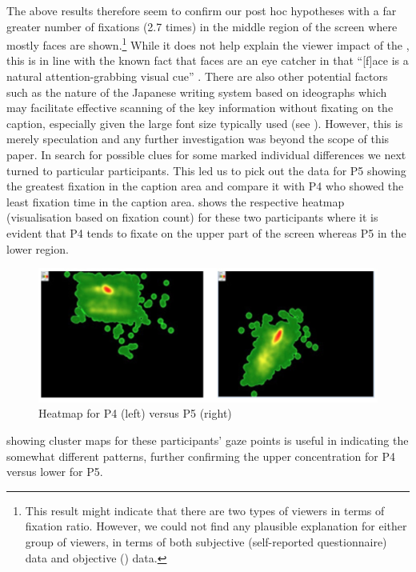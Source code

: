 \documentclass[output=paper]{langsci/langscibook}
\begin{document}
The above results therefore seem to confirm our post hoc hypotheses with a far greater number of fixations (2.7 times) in the middle region of the screen where mostly faces are shown.\footnote{ This result might indicate that there are two types of viewers in terms of fixation ratio. However, we could not find any plausible explanation for either group of viewers, in terms of both subjective (self-reported questionnaire) data and objective () data.} While it does not help explain the viewer impact of the , this is in line with the known fact that faces are an eye catcher in that ``[f]ace is a natural attention-grabbing visual cue'' \citep[264]{perego2010}. There are also other potential factors such as the nature of the Japanese writing system based on ideographs which may facilitate effective scanning of the key information without fixating on the caption, especially given the large font size typically used (see ). However, this is merely speculation and any further investigation was beyond the scope of this paper. In search for possible clues for some marked individual differences we next turned to particular participants.  This led us to pick out the data for P5 showing the greatest fixation in the caption area and compare it with P4 who showed the least fixation time in the caption area.   shows the respective heatmap (visualisation based on fixation count) for these two participants where it is evident that P4 tends to fixate on the upper part of the screen whereas P5 in the lower region.
 
\begin{figure}[t]
 \includegraphics[width=\textwidth]{figures/OHagan6.png}
\caption{Heatmap for P4 (left) versus P5 (right)}
\label{ohagan:fig:6}
\end{figure}

 showing cluster maps for these participants' gaze points is useful in indicating the somewhat different  patterns, further confirming the upper concentration for P4 versus lower for P5.
\end{document}
